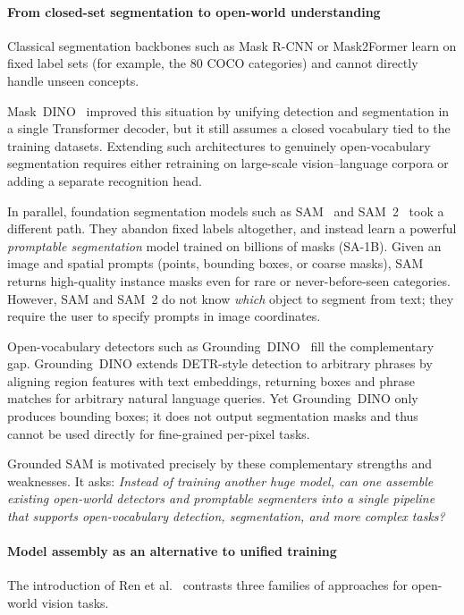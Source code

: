 \begin{enrichment}
\begin{enrichment}
		\paragraph{From closed-set segmentation to open-world understanding}
		Classical segmentation backbones such as Mask R-CNN or Mask2Former learn on fixed label sets (for example, the 80 COCO categories) and cannot directly handle unseen concepts.
		
		\newpage
		
		Mask~DINO~\cite{li2022_maskdino} improved this situation by unifying detection and segmentation in a single Transformer decoder, but it still assumes a closed vocabulary tied to the training datasets.
		Extending such architectures to genuinely open-vocabulary segmentation requires either retraining on large-scale vision–language corpora or adding a separate recognition head.
		
		In parallel, foundation segmentation models such as SAM~\cite{kirillov2023_sam} and SAM~2~\cite{ravi2024_sam2} took a different path.
		They abandon fixed labels altogether, and instead learn a powerful \emph{promptable segmentation} model trained on billions of masks (SA-1B).
		Given an image and spatial prompts (points, bounding boxes, or coarse masks), SAM returns high-quality instance masks even for rare or never-before-seen categories.
		However, SAM and SAM~2 do not know \emph{which} object to segment from text; they require the user to specify prompts in image coordinates.
		
		Open-vocabulary detectors such as Grounding~DINO~\cite{liu2023_groundingdino} fill the complementary gap.
		Grounding~DINO extends DETR-style detection to arbitrary phrases by aligning region features with text embeddings, returning boxes and phrase matches for arbitrary natural language queries.
		Yet Grounding~DINO only produces bounding boxes; it does not output segmentation masks and thus cannot be used directly for fine-grained per-pixel tasks.
		
		Grounded SAM is motivated precisely by these complementary strengths and weaknesses.
		It asks: \emph{Instead of training another huge model, can one assemble existing open-world detectors and promptable segmenters into a single pipeline that supports open-vocabulary detection, segmentation, and more complex tasks?}
		
		\paragraph{Model assembly as an alternative to unified training}
		The introduction of Ren et al.~\cite{ren2024_groundedsam} contrasts three families of approaches for open-world vision tasks.
		

\end{enrichment}
\end{enrichment}
